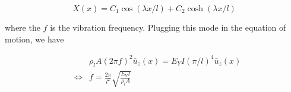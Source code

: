 \documentclass{article}
\begin{document}
\begin{equation}
X(x) = C_1 \cos{(\lambda x/l)} + C_2 \cosh{(\lambda x/l) } 
\end{equation}


%
where the $f$ is the vibration frequency. 
%
Plugging this mode in the equation of motion, we have

\begin{eqnarray}
&&
    \rho_l A (2\pi f)^2
    \bar{u}_z(x)
    = 
    E_Y I (\pi/l)^4
    \bar{u}_z(x)\\
&\Leftrightarrow&
f = \frac{2\pi}{l^2}\sqrt{\frac{E_Y I }{\rho_l A}}
\end{eqnarray}

\fi










\end{document}
